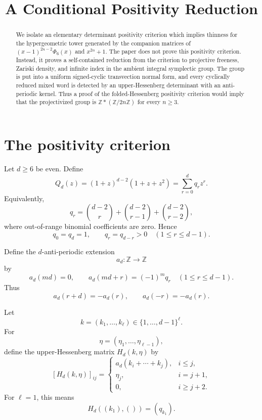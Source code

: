 \documentclass[a4paper,11pt]{amsart}
\title{A Conditional Positivity Reduction}
\date{}
\newcommand{\Z}{\mathbb Z}
\theoremstyle{remark}
\numberwithin{equation}{section}
\begin{document}
\begin{abstract}
We isolate an elementary determinant positivity criterion which implies thinness for the hypergeometric tower generated by the companion matrices of \((x-1)^{2n-2}\Phi_6(x)\) and \(x^{2n}+1\). The paper does not prove this positivity criterion. Instead, it proves a self-contained reduction from the criterion to projective freeness, Zariski density, and infinite index in the ambient integral symplectic group. The group is put into a uniform signed-cyclic transvection normal form, and every cyclically reduced mixed word is detected by an upper-Hessenberg determinant with an anti-periodic kernel. Thus a proof of the folded-Hessenberg positivity criterion would imply that the projectivized group is \(\Z*(\Z/2n\Z)\) for every \(n\geq3\).
\end{abstract}

\maketitle

\section{The positivity criterion}

Let \(d\geq6\) be even. Define
\[
Q_d(z)
=
(1+z)^{d-2}(1+z+z^2)
=
\sum_{r=0}^{d}q_rz^r.
\]
Equivalently,
\[
q_r=
\binom{d-2}{r}
+\binom{d-2}{r-1}
+\binom{d-2}{r-2},
\]
where out-of-range binomial coefficients are zero. Hence
\[
q_0=q_d=1,
\qquad
q_r=q_{d-r}>0
\quad(1\leq r\leq d-1).
\]

Define the \(d\)-anti-periodic extension
\[
a_d:\Z\longrightarrow\Z
\]
by
\begin{equation}\label{eq:adef}
a_d(md)=0,
\qquad
a_d(md+r)=(-1)^mq_r
\quad(1\leq r\leq d-1).
\end{equation}
Thus
\[
a_d(r+d)=-a_d(r),
\qquad
a_d(-r)=-a_d(r).
\]

Let
\[
k=(k_1,\ldots,k_\ell)\in\{1,\ldots,d-1\}^{\ell}.
\]
For
\[
\eta=(\eta_1,\ldots,\eta_{\ell-1}),
\]
define the upper-Hessenberg matrix \(H_d(k,\eta)\) by
\begin{equation}\label{eq:Hdef}
[H_d(k,\eta)]_{ij}
=
\begin{cases}
a_d(k_i+\cdots+k_j),&i\leq j,\\[2mm]
\eta_j,&i=j+1,\\[2mm]
0,&i\geq j+2.
\end{cases}
\end{equation}
For \(\ell=1\), this means
\[
H_d((k_1),())=(q_{k_1}).
\]
\end{document}
